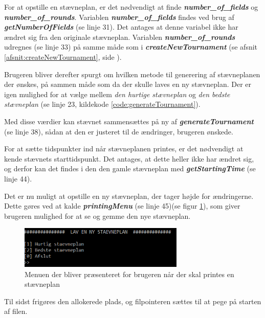 For at opstille en stævneplan, er det nødvendigt at finde \textbf{\textit{number\_of\_fields}} og \textbf{\textit{number\_of\_rounds}}. Variablen \textbf{\textit{number\_of\_fields}} findes ved brug af \textbf{\textit{getNumberOfFields}} (se linje 31). Det antages at denne variabel ikke har ændret sig fra den originale stævneplan. Variablen \textbf{\textit{number\_of\_rounds}} udregnes (se linje 33) på samme måde som i \textbf{\textit{createNewTournament}} (se afsnit \ref{afsnit:createNewTournament}, side \pageref{afsnit:createNewTournament}).

\par
Brugeren bliver derefter spurgt om hvilken metode til generering af stævneplanen der ønskes, på sammen måde som da der skulle laves en ny stævneplan. Der er igen mulighed for at vælge mellem \textit{den hurtige stævneplan} og \textit{den bedste stævneplan} (se linje 23, kildekode \ref{code:generateTournament}).
\par
Med disse værdier kan stævnet sammensættes på ny af \textbf{\textit{generateTournament}} (se linje 38), sådan at den er justeret til de ændringer, brugeren ønskede.
\par
For at sætte tidspunkter ind når stævneplanen printes, er det nødvendigt at kende stævnets starttidspunkt. Det antages, at dette heller ikke har ændret sig, og derfor kan det findes i den den gamle stævneplan med \textbf{\textit{getStartingTime}} (se linje 44).
\par
Det er nu muligt at opstille en ny stævneplan, der tager højde for ændringerne. Dette gøres ved at kalde \textbf{\textit{printingMenu}} (se linje 45)(se figur \ref{fig:printmenu}), som giver brugeren mulighed for at se og gemme den nye stævneplan.
\begin{figure}[H]
  \centering
  \includegraphics[width=0.7\textwidth]{figures/PrintingMenuScreenshot.PNG}
  \caption{Menuen der bliver præsenteret for brugeren når der skal printes en stævneplan}
  \label{fig:printmenu}
\end{figure}
\par
Til sidst frigøres den allokerede plads, og filpointeren sættes til at pege på starten af filen.

